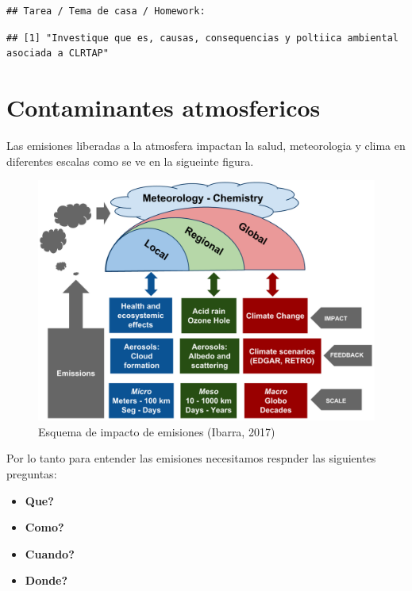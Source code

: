\documentclass[]{book}
\providecommand{\tightlist}{%
  \setlength{\itemsep}{0pt}\setlength{\parskip}{0pt}}
\begin{document}
\begin{verbatim}
## Tarea / Tema de casa / Homework:
\end{verbatim}

\begin{verbatim}
## [1] "Investique que es, causas, consequencias y poltiica ambiental asociada a CLRTAP"
\end{verbatim}

\hypertarget{contaminantes-atmosfericos}{%
\section{Contaminantes atmosfericos}\label{contaminantes-atmosfericos}}

Las emisiones liberadas a la atmosfera impactan la salud, meteorologia y clima en diferentes escalas como se ve en la sigueinte figura.

\begin{figure}
\includegraphics[width=1.3\linewidth]{figs/esquema} \caption{Esquema de impacto de emisiones (Ibarra, 2017)}\label{fig:unnamed-chunk-10}
\end{figure}

Por lo tanto para entender las emisiones necesitamos respnder las siguientes preguntas:

\begin{itemize}
\tightlist
\item
  \textbf{Que?}
\item
  \textbf{Como?}
\item
  \textbf{Cuando?}
\item
  \textbf{Donde?}
\end{itemize}
\end{document}
